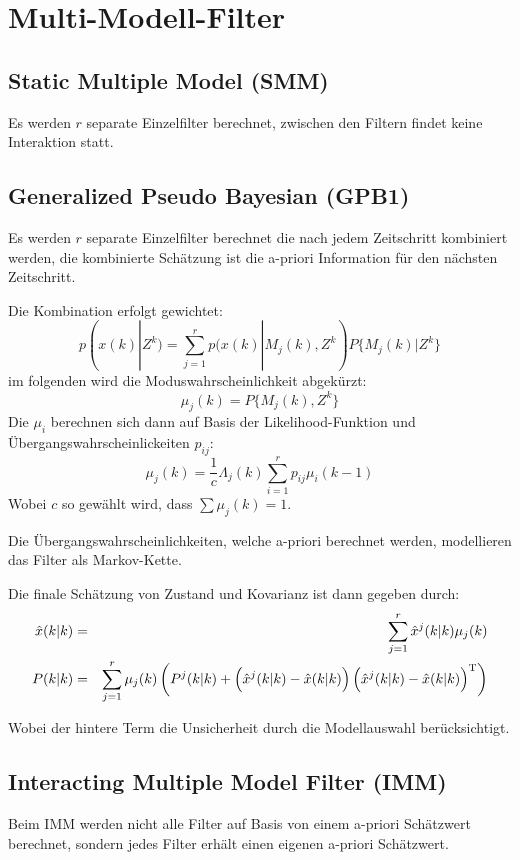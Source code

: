 \chapter{Multi-Modell-Filter}
\section{Static Multiple Model (SMM)}
Es werden $r$ separate Einzelfilter berechnet, zwischen den Filtern findet keine Interaktion statt.

\section{Generalized Pseudo Bayesian (GPB1)}
Es werden $r$ separate Einzelfilter berechnet die nach jedem Zeitschritt kombiniert werden, die kombinierte Schätzung ist die a-priori Information für den nächsten Zeitschritt.

Die Kombination erfolgt gewichtet:
\begin{equation*}
    p(x(k) | Z^k) = \sum_{j=1}^r p(x(k)|M_j(k), Z^k) P\{M_j(k) | Z^k\}
\end{equation*}
im folgenden wird die Moduswahrscheinlichkeit abgekürzt:
\begin{equation*}
    \mu_j (k) = P\{M_j(k), Z^k\}
\end{equation*}
Die $\mu_i$ berechnen sich dann auf Basis der Likelihood-Funktion und Übergangswahrscheinlickeiten $p_{ij}$:
\begin{equation*}
    \mu_j(k) = \frac{1}{c} \Lambda_j(k) \sum_{i=1}^r p_{ij} \mu_i(k-1)
\end{equation*}
Wobei $c$ so gewählt wird, dass $\sum \mu_j(k) = 1$.

Die Übergangswahrscheinlichkeiten, welche a-priori berechnet werden, modellieren das Filter als Markov-Kette. 

Die finale Schätzung von Zustand und Kovarianz ist dann gegeben durch:
\begin{eqnarray*}
    \hat{x}(k|k) &=& \sum_{j=1}^r \hat{x}^j (k|k) \mu_j(k) \\
    P(k|k) &=& \sum_{j=1}^r \mu_j(k) \left( P^j(k|k) + \left(\hat{x}^j(k|k) - \hat{x}(k|k)\right) \left(\hat{x}^j(k|k) - \hat{x}(k|k)\right)^\text{T} \right)
\end{eqnarray*}

Wobei der hintere Term die Unsicherheit durch die Modellauswahl berücksichtigt.

\section{Interacting Multiple Model Filter (IMM)}
Beim IMM werden nicht alle Filter auf Basis von einem a-priori Schätzwert berechnet, sondern jedes Filter erhält einen eigenen a-priori Schätzwert.


